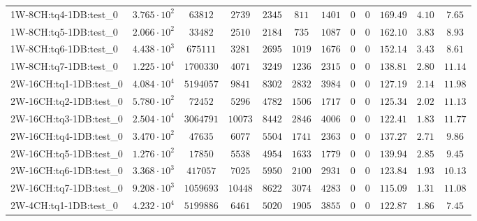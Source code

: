 \begin{tabular}{|l|c|c|c|c|c|c|c|c|c|c|c|}
1W-8CH:tq4-1DB:test\_0   & $ 3.765 \cdot 10^{2} $ & $ 63812     $ & $ 2739    $ & $ 2345   $ & $ 811    $ & $ 1401   $ & $ 0 $ & $ 0 $ & $ 169.49      $ & $ 4.10    $ & $ 7.65    $ \\
1W-8CH:tq5-1DB:test\_0   & $ 2.066 \cdot 10^{2} $ & $ 33482     $ & $ 2510    $ & $ 2184   $ & $ 735    $ & $ 1087   $ & $ 0 $ & $ 0 $ & $ 162.10      $ & $ 3.83    $ & $ 8.93    $ \\
1W-8CH:tq6-1DB:test\_0   & $ 4.438 \cdot 10^{3} $ & $ 675111    $ & $ 3281    $ & $ 2695   $ & $ 1019   $ & $ 1676   $ & $ 0 $ & $ 0 $ & $ 152.14      $ & $ 3.43    $ & $ 8.61    $ \\
1W-8CH:tq7-1DB:test\_0   & $ 1.225 \cdot 10^{4} $ & $ 1700330   $ & $ 4071    $ & $ 3249   $ & $ 1236   $ & $ 2315   $ & $ 0 $ & $ 0 $ & $ 138.81      $ & $ 2.80    $ & $ 11.14   $ \\
2W-16CH:tq1-1DB:test\_0  & $ 4.084 \cdot 10^{4} $ & $ 5194057   $ & $ 9841    $ & $ 8302   $ & $ 2832   $ & $ 3984   $ & $ 0 $ & $ 0 $ & $ 127.19      $ & $ 2.14    $ & $ 11.98   $ \\
2W-16CH:tq2-1DB:test\_0  & $ 5.780 \cdot 10^{2} $ & $ 72452     $ & $ 5296    $ & $ 4782   $ & $ 1506   $ & $ 1717   $ & $ 0 $ & $ 0 $ & $ 125.34      $ & $ 2.02    $ & $ 11.13   $ \\
2W-16CH:tq3-1DB:test\_0  & $ 2.504 \cdot 10^{4} $ & $ 3064791   $ & $ 10073   $ & $ 8442   $ & $ 2846   $ & $ 4006   $ & $ 0 $ & $ 0 $ & $ 122.41      $ & $ 1.83    $ & $ 11.77   $ \\
2W-16CH:tq4-1DB:test\_0  & $ 3.470 \cdot 10^{2} $ & $ 47635     $ & $ 6077    $ & $ 5504   $ & $ 1741   $ & $ 2363   $ & $ 0 $ & $ 0 $ & $ 137.27      $ & $ 2.71    $ & $ 9.86    $ \\
2W-16CH:tq5-1DB:test\_0  & $ 1.276 \cdot 10^{2} $ & $ 17850     $ & $ 5538    $ & $ 4954   $ & $ 1633   $ & $ 1779   $ & $ 0 $ & $ 0 $ & $ 139.94      $ & $ 2.85    $ & $ 9.45    $ \\
2W-16CH:tq6-1DB:test\_0  & $ 3.368 \cdot 10^{3} $ & $ 417057    $ & $ 7025    $ & $ 5950   $ & $ 2100   $ & $ 2931   $ & $ 0 $ & $ 0 $ & $ 123.84      $ & $ 1.93    $ & $ 10.13   $ \\
2W-16CH:tq7-1DB:test\_0  & $ 9.208 \cdot 10^{3} $ & $ 1059693   $ & $ 10448   $ & $ 8622   $ & $ 3074   $ & $ 4283   $ & $ 0 $ & $ 0 $ & $ 115.09      $ & $ 1.31    $ & $ 11.08   $ \\
2W-4CH:tq1-1DB:test\_0   & $ 4.232 \cdot 10^{4} $ & $ 5199886   $ & $ 6461    $ & $ 5020   $ & $ 1905   $ & $ 3855   $ & $ 0 $ & $ 0 $ & $ 122.87      $ & $ 1.86    $ & $ 7.45    $ \\

\end{tabular}
